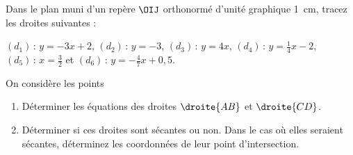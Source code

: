 %
%
%
\begin{exr} Dans le plan muni d'un repère $\OIJ$ orthonormé d'unité graphique \SI{1}{\centi\meter}, tracez les droites suivantes :
  \begin{centered}
$\left(d_1\right)\,:\,y=-3x+2$, $\left(d_2\right)\,:\,y=-3$, $\left(d_3\right)\,:\,y=4x$, $\left(d_4\right)\,:\,y=\frac14x-2$, $\left(d_5\right)\,:\,x=\frac32$ et $\left(d_6\right)\,:\,y=-\frac47x+0,5$.  
  \end{centered}
\end{exr}
%
%
%
\begin{exr}
On considère les points \typepoints\mypoints
  \begin{enumerate}
  \item Déterminer les équations des droites $\droite{AB}$ et $\droite{CD}$.
  \item Déterminer si ces droites sont sécantes ou non. Dans le cas où elles seraient sécantes, déterminez les coordonnées de leur point d'intersection. 
  \end{enumerate}
\end{exr}
